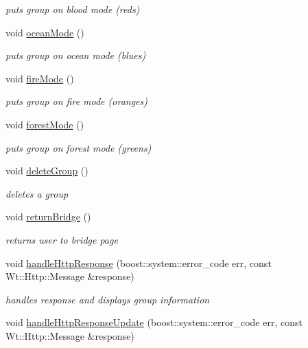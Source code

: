 \begin{DoxyCompactItemize}
\begin{DoxyCompactList}\small\item\em puts group on blood mode (reds) \end{DoxyCompactList}\item 
void \hyperlink{class_single_groups_control_widget_afa302c84232d4a1fb69ef4da6528f0ec}{ocean\+Mode} ()
\begin{DoxyCompactList}\small\item\em puts group on ocean mode (blues) \end{DoxyCompactList}\item 
void \hyperlink{class_single_groups_control_widget_a41395f061e8d93131b0e8c1b880eab59}{fire\+Mode} ()
\begin{DoxyCompactList}\small\item\em puts group on fire mode (oranges) \end{DoxyCompactList}\item 
void \hyperlink{class_single_groups_control_widget_a6d940daceffefb6e5d17def4c4b24acc}{forest\+Mode} ()
\begin{DoxyCompactList}\small\item\em puts group on forest mode (greens) \end{DoxyCompactList}\item 
void \hyperlink{class_single_groups_control_widget_a1bb02de2f9fcda2cf5ef37c95d341975}{delete\+Group} ()
\begin{DoxyCompactList}\small\item\em deletes a group \end{DoxyCompactList}\item 
void \hyperlink{class_single_groups_control_widget_a25051151a10f35c0e196ccb0fd52f7f8}{return\+Bridge} ()
\begin{DoxyCompactList}\small\item\em returns user to bridge page \end{DoxyCompactList}\item 
void \hyperlink{class_single_groups_control_widget_a4aff4c45ad69e3fc391f89f14ecc1ebb}{handle\+Http\+Response} (boost\+::system\+::error\+\_\+code err, const Wt\+::\+Http\+::\+Message \&response)
\begin{DoxyCompactList}\small\item\em handles response and displays group information \end{DoxyCompactList}\item 
void \hyperlink{class_single_groups_control_widget_a5049556fc39b63323ab534ba65e398e3}{handle\+Http\+Response\+Update} (boost\+::system\+::error\+\_\+code err, const Wt\+::\+Http\+::\+Message \&response)

\end{DoxyCompactItemize}

